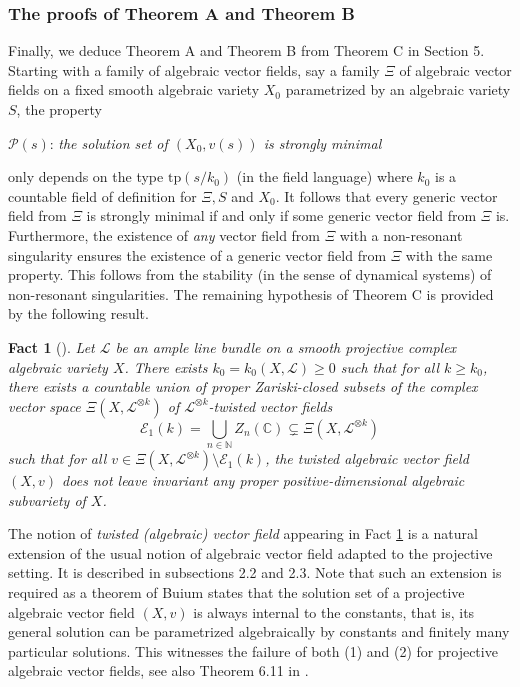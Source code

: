 \documentclass[12pt]{amsart}
\newcommand{\N}{\mathbb{N}}
\theoremstyle{definition}
\theoremstyle{plain}
\newtheorem{fact}[definition]{Fact}
\theoremstyle{exampstyle}
\theoremstyle{exampstyle}\newtheorem{thmxbis}{Theorem}
\numberwithin{equation}{section}
\theoremstyle{remark}
\begin{document}
\subsubsection*{The proofs of Theorem A and Theorem B} Finally, we deduce Theorem A and Theorem B from Theorem C in Section 5. Starting with a family of algebraic vector fields, say a family $\Xi$ of algebraic vector fields  on a fixed smooth algebraic variety $X_0$ parametrized by an algebraic variety $S$, the property 
\begin{center} 
$\mathcal P(s)$: \textit{the solution set of $(X_0,v(s))$ is strongly minimal} 
\end{center}
only depends on the type $\mathrm{tp}(s/k_0)$ (in the field language) where $k_0$ is a countable field of definition for $\Xi,S$ and $X_0$. It follows that every generic vector field from $\Xi$ is strongly minimal if and only if some generic vector field from $\Xi$ is. Furthermore, the existence of {\em any} vector field from $\Xi$ with a non-resonant singularity ensures the existence of a generic vector field from $\Xi$ with the same property. This follows from the stability (in the sense of dynamical systems) of non-resonant singularities. The remaining hypothesis of Theorem C is provided by the following result.
  
\begin{fact}[{\citep[Theorem 1.1]{Coutinho-Pereira}}]\label{fact-Pereira-Coutinho-int}
Let $\mathcal L$ be an ample line bundle on a smooth projective complex algebraic variety $X$. There exists $k_0 = k_0(X,\mathcal L) \geq 0$ such that for all $k \geq k_0$, there exists a countable union of proper Zariski-closed subsets of the complex vector space $\Xi(X,\mathcal L^{\otimes k})$ of {\em $\mathcal L^{\otimes k}$-twisted vector fields}
$$\mathcal E_1(k) = \bigcup_{n \in \N} Z_n(\mathbb{C}) \subsetneq \Xi(X,\mathcal L^{\otimes k})$$ 
such that for all $v \in  \Xi(X,\mathcal L^{\otimes k}) \setminus \mathcal E_1(k)$, the {\em twisted algebraic vector field $(X,v)$} does  not leave invariant any proper positive-dimensional algebraic subvariety of $X$. 
\end{fact}

The notion of {\em twisted (algebraic) vector field} appearing in Fact \ref{fact-Pereira-Coutinho-int} is a natural extension of the usual notion of algebraic vector field adapted to the projective setting. It is described in subsections 2.2 and 2.3. Note that such an extension is required as a theorem of Buium \cite{Buium-projective} states that the solution set of a projective algebraic vector field $(X,v)$ is always internal to the constants, that is, its general solution can be parametrized algebraically by constants and finitely many particular solutions. This witnesses the failure of both (1) and (2) for projective algebraic vector fields, see also Theorem 6.11 in \cite{Jaoui-Moosa}.
\end{document}
